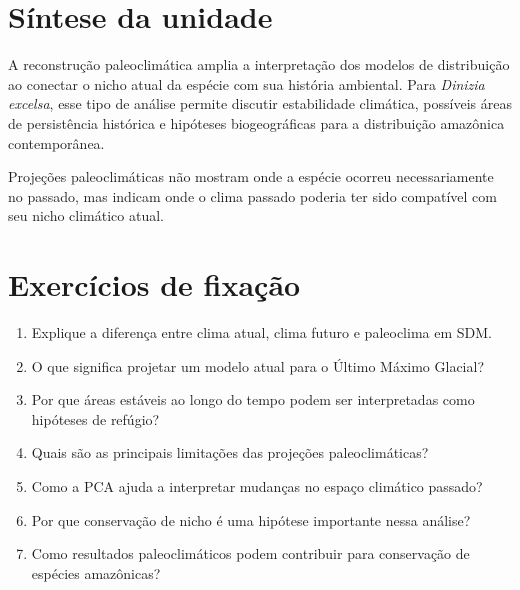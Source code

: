 
\section{Síntese da unidade}

A reconstrução paleoclimática amplia a interpretação dos modelos de distribuição ao conectar o nicho atual da espécie com sua história ambiental. Para \textit{Dinizia excelsa}, esse tipo de análise permite discutir estabilidade climática, possíveis áreas de persistência histórica e hipóteses biogeográficas para a distribuição amazônica contemporânea.

\begin{conceito}[title={\faBook\quad Mensagem central}]
	Projeções paleoclimáticas não mostram onde a espécie ocorreu necessariamente no passado, mas indicam onde o clima passado poderia ter sido compatível com seu nicho climático atual.
\end{conceito}

\section{Exercícios de fixação}

\begin{enumerate}
	\item Explique a diferença entre clima atual, clima futuro e paleoclima em SDM.
	\item O que significa projetar um modelo atual para o Último Máximo Glacial?
	\item Por que áreas estáveis ao longo do tempo podem ser interpretadas como hipóteses de refúgio?
	\item Quais são as principais limitações das projeções paleoclimáticas?
	\item Como a PCA ajuda a interpretar mudanças no espaço climático passado?
	\item Por que conservação de nicho é uma hipótese importante nessa análise?
	\item Como resultados paleoclimáticos podem contribuir para conservação de espécies amazônicas?
\end{enumerate}


